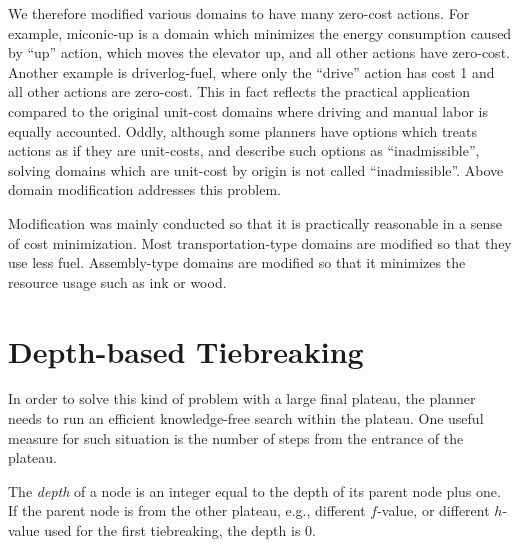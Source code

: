 We therefore modified various domains to have many zero-cost actions.
For example, miconic-up is a domain which minimizes the energy
consumption caused by ``up'' action, which moves the elevator up, and
all other actions have zero-cost. Another example is driverlog-fuel, where only
the ``drive'' action has cost 1 and all other actions are zero-cost.
This in fact reflects the practical application compared to the original
unit-cost domains where driving and manual labor is equally accounted.
Oddly, although some planners have options which treats actions as if
they are unit-costs, and describe such options as ``inadmissible'',
solving domains which are unit-cost by origin is not called
``inadmissible''. Above domain modification addresses this problem.

Modification was mainly conducted so that it is practically reasonable
in a sense of cost minimization. Most transportation-type domains are
modified so that they use less fuel. Assembly-type domains are modified
so that it minimizes the resource usage such as ink or wood.

\section{Depth-based Tiebreaking}

In order to solve this kind of problem with a large final plateau, the
planner needs to run an efficient knowledge-free search within the plateau.
One useful measure for such situation is the number of steps from
the entrance of the plateau.

The \emph{depth} of a node is an integer equal to the depth of its
parent node plus one. If the parent node is from the other plateau,
e.g., different $f$-value, or different $h$-value used for the first
tiebreaking, the depth is 0.

